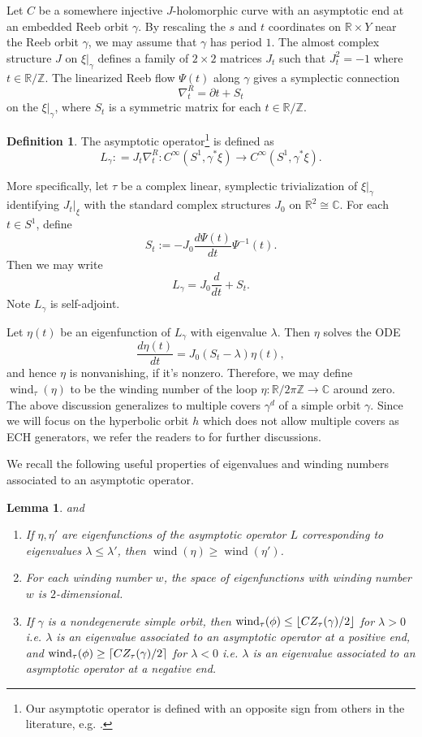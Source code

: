 \documentclass{article}
\numberwithin{equation}{section}
\newtheorem{lemma}[theorem]{Lemma}
\theoremstyle{definition}
\newtheorem{definition}[theorem]{Definition}
\newcommand{\R}{\mathbb{R}}
\newcommand{\C}{\mathbb{C}}
\newcommand{\Z}{\mathbb{Z}}
\newcommand{\wind}{\operatorname{wind}}
\DeclarePairedDelimiter{\ceil}{\lceil}{\rceil}
\DeclarePairedDelimiter{\floor}{\lfloor}{\rfloor}
\begin{document}
Let $C$ be a somewhere injective $J$-holomorphic curve with an asymptotic end at an embedded Reeb orbit $\gamma$. By rescaling the $s$ and $t$ coordinates on $\R \times Y$ near the Reeb orbit $\gamma$, we may assume that $\gamma$ has period $1$. The almost complex structure $J$ on $\xi|_\gamma$ defines a family of $2 \times 2$ matrices $J_t$ such that $J_t^2 = -1$ where $t\in \R/\Z$. The linearized Reeb flow $\Psi(t)$ along $\gamma$ gives a symplectic connection 
$$\nabla^R_t = \partial t + S_t$$ 
on the $\xi|_\gamma$, where $S_t$ is a symmetric matrix for each $t\in \R/\Z$. 


\begin{definition}
\label{def:asymptotic_operator}
The asymptotic operator\footnote{Our asymptotic operator is defined with an opposite sign from others in the literature, e.g. \cite{HWZI}.} is defined as 
$$L_\gamma: = J_t \nabla^R_t: C^\infty(S^1, \gamma^* \xi) \to C^\infty(S^1, \gamma^* \xi).$$
\end{definition}
 
More specifically, let $\tau$ be a complex linear, symplectic trivialization of $\xi|_\gamma$ identifying $J_t|_\xi$ with the standard complex structures $J_0$ on $\R^2 \cong \C$. For each $t\in S^1$, define 
$$S_t:= - J_0 \frac{d \Psi(t)}{dt} \Psi^{-1}(t).$$ Then we may write 
$$L_\gamma = J_0 \frac{d}{dt} + S_t.$$
Note $L_\gamma$ is self-adjoint.


Let $\eta(t)$ be an eigenfunction of $L_\gamma$ with eigenvalue $\lambda$. Then $\eta$ solves the ODE
$$\frac{d\eta(t)}{dt} = J_0(S_t - \lambda) \eta(t),$$
and hence $\eta$ is nonvanishing, if it's nonzero. Therefore, we may define $\wind_\tau(\eta)$ to be the winding number of the loop $\eta: \R/2\pi \Z \to \C$ around zero. The above discussion generalizes to multiple covers $\gamma^d$ of a simple orbit $\gamma$. Since we will focus on the hyperbolic orbit $h$ which does not allow multiple covers as ECH generators, we refer the readers to \cite{Siefring, HT_gluing1} for further discussions. 

We recall the following useful properties of eigenvalues and winding numbers associated to an asymptotic operator. 


\begin{lemma}\cite[Lemma 6.4]{Hutchings_index_inequality} and \cite[Chapter 3]{HWZII}
\label{lem:eigen_lemmas}
\begin{enumerate}
    \item If $\eta, \eta'$ are eigenfunctions of the asymptotic operator $L$ corresponding to eigenvalues $\lambda\leq \lambda'$, then $\wind(\eta)\geq \wind(\eta')$.
    \item For each winding number $w$, the space of eigenfunctions with winding number $w$ is $2$-dimensional.
    \item If $\gamma$ is a nondegenerate simple orbit, then $\wind_\tau (\phi) \leq \floor{CZ_\tau(\gamma)/2}$ for $\lambda >0$ i.e. $\lambda$ is an eigenvalue associated to an asymptotic operator at a positive end, and $\wind_\tau (\phi) \geq \ceil{CZ_\tau(\gamma)/2}$ for $\lambda < 0$ i.e. $\lambda$ is an eigenvalue associated to an asymptotic operator at a negative end.
\end{enumerate}
\end{lemma}
\end{document}
